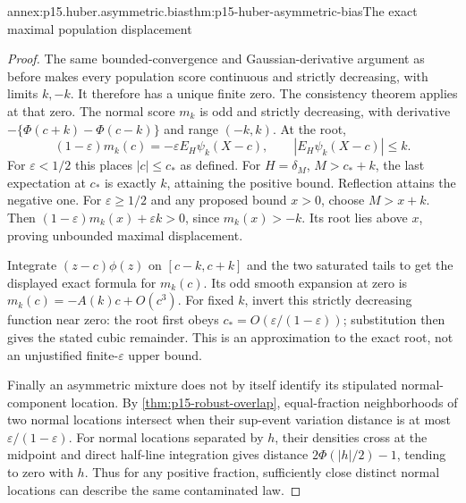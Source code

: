 \begin{annexitem}{annex:p15.huber.asymmetric.bias}{thm:p15-huber-asymmetric-bias}{The exact maximal population displacement}
\begin{proof}
The same bounded-convergence and Gaussian-derivative argument as
before makes every population score continuous and strictly decreasing,
with limits \(k,-k\). It therefore has a unique finite zero.
The consistency theorem applies at that zero.
The normal score \(m_k\) is odd and strictly decreasing, with
derivative \(-\{\Phi(c+k)-\Phi(c-k)\}\) and range \((-k,k)\).
At the root,
\[
 (1-\varepsilon)m_k(c)
       =-\varepsilon E_H\psi_k(X-c),\qquad
 |E_H\psi_k(X-c)|\leq k .
\]
For \(\varepsilon<1/2\) this places \(|c|\leq c_*\) as defined.
For \(H=\delta_M\), \(M>c_*+k\), the last expectation at \(c_*\)
is exactly \(k\), attaining the positive bound.
Reflection attains the negative one.
For \(\varepsilon\geq1/2\) and any proposed bound \(x>0\),
choose \(M>x+k\). Then
\((1-\varepsilon)m_k(x)+\varepsilon k>0\), since \(m_k(x)>-k\).
Its root lies above \(x\), proving unbounded maximal displacement.

Integrate \((z-c)\phi(z)\) on \([c-k,c+k]\) and the two saturated
tails to get the displayed exact formula for \(m_k(c)\).
Its odd smooth expansion at zero is
\(m_k(c)=-A(k)c+O(c^3)\).
For fixed \(k\), invert this strictly decreasing function near zero:
the root first obeys \(c_*=O(\varepsilon/(1-\varepsilon))\);
substitution then gives the stated cubic remainder.
This is an approximation to the exact root, not an unjustified
finite-\(\varepsilon\) upper bound.

Finally an asymmetric mixture does not by itself identify its
stipulated normal-component location. By
\cref{thm:p15-robust-overlap}, equal-fraction neighborhoods of two
normal locations intersect when their sup-event variation distance
is at most \(\varepsilon/(1-\varepsilon)\).
For normal locations separated by \(h\), their densities cross at
the midpoint and direct half-line integration gives distance
\(2\Phi(|h|/2)-1\), tending to zero with \(h\).
Thus for any positive fraction, sufficiently close distinct normal
locations can describe the same contaminated law.
\end{proof}
\end{annexitem}

